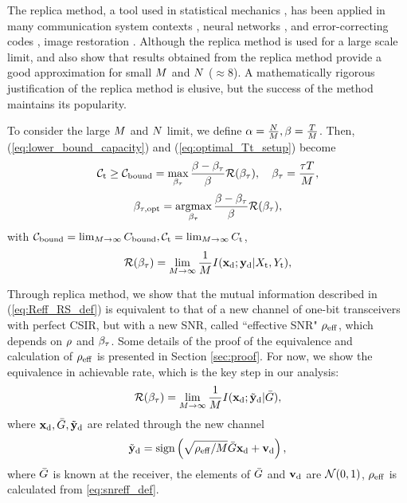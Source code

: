 \documentclass[conference]{IEEEtran}
\begin{document}
The replica method, a tool used in statistical mechanics  \cite{mezard1988spin}, has been applied in many communication system contexts \cite{tanaka2001analysis,tanaka2002statistical,guo2005randomly,wen2016bayes}, neural networks \cite{engel2001statistical}, and error-correcting codes \cite{montanari2000statistical},  image restoration \cite{nishimori1999statistical}. Although the replica method is used for a large scale limit, \cite{gao2018capacity} and \cite{moustakas2003mimo} also show that results obtained from the replica method provide a good approximation for small $M$ and $N$ ($\approx 8$). A mathematically rigorous justification of the replica method is elusive, but the success of the method maintains its popularity. 

To consider the large $M$ and $N$ limit, we define $\alpha=\frac{N}{M},\beta=\frac{T}{M}$. Then, (\ref{eq:lower_bound_capacity}) and (\ref{eq:optimal_Tt_setup}) become
\begin{equation}
\mathcal{C}_{\rm{t}}\geq\mathcal{C}_{\rm{bound}}=\max_{\beta_{\rm{\tau}}}\frac{\beta-\beta_{\rm{\tau}}}{\beta}\mathcal{R}(\beta_{\rm{\tau}}),\quad\beta_{\rm{\tau}}=\frac{{\tau T}}{M},
\label{eq:lower_bound_rate_linear_one_bit}
\end{equation}
\begin{equation}
\beta_{\rm {\tau,opt}}=\mathop{\mathrm{argmax}}_{\beta_{\rm{\tau}}}\frac{\beta-\beta_{\rm{\tau}}}{\beta}\mathcal{R}(\beta_{\rm{\tau}}),
\label{eq:optimal_Tt_setup_linear_one_bit}
\end{equation}
with $\mathcal{C}_{\rm{bound}}= \lim_{M\to\infty}C_{\rm {bound}}, \mathcal{C}_{\rm{t}}=\lim_{M\to\infty}C_{\rm t}$,
\begin{equation}
  \mathcal{R}(\beta_{\rm{\tau}})=\lim_{M\to\infty}\frac{1}{M}I({\mathbf{x}}_{\rm d};{\mathbf{y}}_{\rm d}|X_{\rm t},Y_{\rm t}),
  \label{eq:Reff_RS_def}
\end{equation}

Through replica method, we show that the mutual information described in (\ref{eq:Reff_RS_def}) is equivalent to that of a new channel of one-bit transceivers with perfect CSIR, but with a new SNR, called ``effective SNR" $\rho_{\rm {eff}}$, which depends on $\rho$ and $\beta_{\rm{\tau}}$. Some details of the proof of the equivalence and calculation of $\rho_{\rm {eff}}$ is presented in Section \ref{sec:proof}. For now, we show the equivalence in achievable rate, which is the key step in our analysis:
\begin{equation}
    \mathcal{R}(\beta_{\rm{\tau}})=\lim_{M\to\infty}\frac{1}{M}I({\mathbf{x}}_{\rm d};\tilde{{\mathbf{y}}}_{\rm d}|\bar{G}),
    \label{eq:Reff_equivalence}
\end{equation}
where ${\mathbf{x}}_{\rm d},\bar{G},\tilde{{\mathbf{y}}}_{\rm d}$ are related through the new channel
\begin{equation}
    \tilde{{\mathbf{y}}}_{\rm d} = \text{sign}\left(\sqrt{{\rho_{\rm {eff}}}/{M}}\bar{G}{\mathbf{x}}_{\rm d} + {\mathbf{v}}_{\rm d}\right), 
    \label{eq:equivalent_noise_model}
\end{equation}
where $\bar{G}$ is known at the receiver, the elements of $\bar{G}$ and ${\mathbf{v}}_{\rm d}$ are \iid $\mathcal{N}(0,1)$, $\rho_{\rm {eff}}$ is calculated from \eqref{eq:snreff_def}. 
\end{document}
